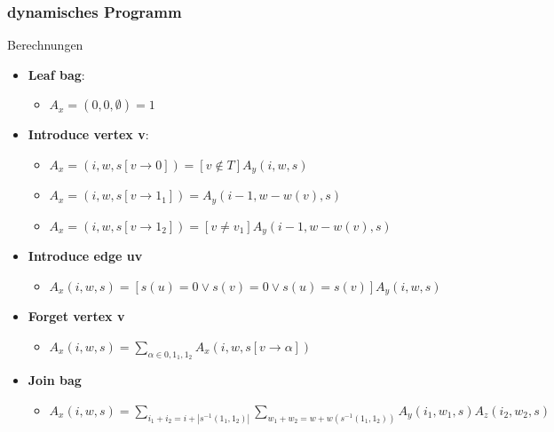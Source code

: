 \documentclass{beamer}
\begin{document}

\begin{frame}
\frametitle{dynamisches Programm}
\begin{block}{Berechnungen}
\begin{itemize}
\item \textbf{Leaf bag}:
\begin{itemize}
\item $A_x=(0,0,\emptyset) = 1$
\end{itemize}
\item \textbf{Introduce vertex v}:
\begin{itemize}
\item $A_x=(i,w,s[v\rightarrow 0]) = [v \notin T]A_y(i,w,s)$
\item $A_x=(i,w,s[v\rightarrow 1_1]) = A_y(i-1,w-w(v),s)$
\item $A_x=(i,w,s[v\rightarrow 1_2]) =[v \neq v_1] A_y(i-1,w-w(v),s)$
\end{itemize}
\item \textbf{Introduce edge uv}
\begin{itemize}
\item $A_x(i,w,s) = [s(u) = 0 \vee s(v) = 0 \vee s(u) = s(v)]A_y(i,w,s)$
\end{itemize}
\item \textbf{Forget vertex v}
\begin{itemize}
\item $A_x(i,w,s) = \sum\limits_{\alpha \in {0,1_1,1_2}} A_x(i,w,s[v \rightarrow \alpha]) $
\end{itemize}
\item \textbf{Join bag}
\begin{itemize}
\item $A_x(i,w,s) = \sum\limits_{i_1+i_2=i+|s^{-1}({1_1,1_2})|} \sum\limits_{w_1+w_2=w+w(s^{-1}({1_1,1_2}))} A_y(i_1,w_1,s)A_z(i_2,w_2,s) $
\end{itemize}
\end{itemize}
\end{block}
\end{frame}
\end{document}
